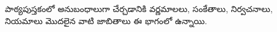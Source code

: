 \documentclass[../../include/open-logic-part]{subfiles}
\begin{document}

\begin{editorial}
  పాఠ్యపుస్తకంలో అనుబంధాలుగా చేర్చడానికి వర్ణమాలలు, సంకేతాలు,
  నిర్వచనాలు, నియమాలు మొదలైన వాటి జాబితాలు ఈ భాగంలో ఉన్నాయి.
\end{editorial}



\OLEndPartHook
\end{document}
